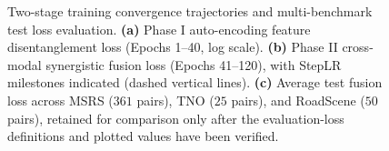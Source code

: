 \begin{figure}[t]
    \caption{Two-stage training convergence trajectories and multi-benchmark test loss evaluation. \textbf{(a)} Phase I auto-encoding feature disentanglement loss (Epochs 1--40, log scale). \textbf{(b)} Phase II cross-modal synergistic fusion loss (Epochs 41--120), with StepLR milestones indicated (dashed vertical lines). \textbf{(c)} Average test fusion loss across MSRS ($361$ pairs), TNO ($25$ pairs), and RoadScene ($50$ pairs), retained for comparison only after the evaluation-loss definitions and plotted values have been verified.}
    \label{fig:loss_convergence}
\end{figure}